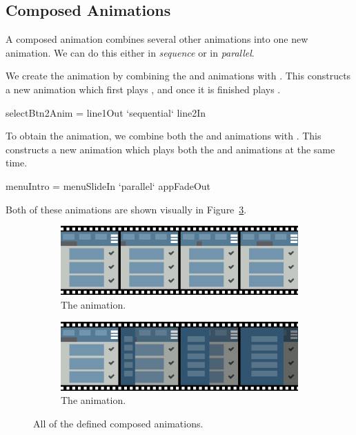 \subsection{Composed Animations}

A composed animation combines several other animations into one new animation. We can do this either in \emph{sequence} or in \emph{parallel}.

We create the  animation by combining the  and  animations with . This constructs a new animation which first plays , and once it is finished plays .

\begin{spec}
selectBtn2Anim = line1Out `sequential` line2In
\end{spec}

To obtain the  animation, we combine both the  and  animations with . This constructs a new animation which plays both the  and  animations at the same time.

\begin{spec}
menuIntro = menuSlideIn `parallel` appFadeOut
\end{spec}

Both of these animations are shown visually in Figure~\ref{fig:composed}.

\begin{figure}[!htbp]
\centering

\begin{subfigure}[h]{\textwidth}
\centering
\includegraphics[width=\figscale\textwidth]{pictures/selectBtn2AnimFig}
\caption{The  animation.}
\label{fig:composed1}
\end{subfigure}

\begin{subfigure}[h]{\textwidth}
\centering
\includegraphics[width=\figscale\textwidth]{pictures/menuIntroFig}
\caption{The  animation.}
\label{fig:composed2}
\end{subfigure}

\caption{All of the defined composed animations.}
\label{fig:composed}
\end{figure}
